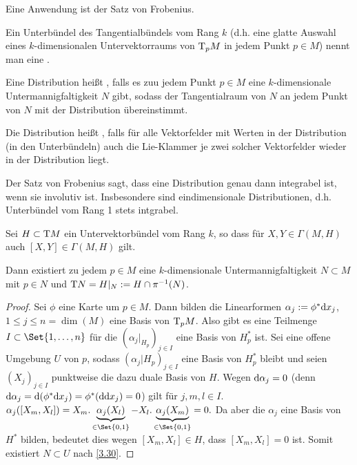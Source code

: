 Eine Anwendung ist der Satz von Frobenius.

Ein Unterbündel des Tangentialbündels vom Rang $k$ (d.h. eine glatte Auswahl eines $k$-dimensionalen Untervektorraums von $\mathrm{T}_p M$ in jedem Punkt $p \in M$) nennt man eine .

Eine Distribution heißt , falls es zuu jedem Punkt $p \in M$ eine $k$-dimensionale Untermannigfaltigkeit $N$ gibt, sodass der Tangentialraum von $N$ an jedem Punkt von $N$ mit der Distribution übereinstimmt.

Die Distribution heißt , falls für alle Vektorfelder mit Werten in der Distribution (in den Unterbündeln) auch die Lie-Klammer je zwei solcher Vektorfelder wieder in der Distribution liegt.

Der Satz von Frobenius sagt, dass eine Distribution genau dann integrabel ist, wenn sie involutiv ist.
Insbesondere sind eindimensionale Distributionen, d.h. Unterbündel vom Rang 1 stets intgrabel.

\begin{st}[Frobenius] \label{6.14}
    Sei $H \subset \mathrm{T} M$ ein Untervektorbündel vom Rang $k$, so dass für $X, Y \in \Gamma(M, H)$ auch $[X, Y] \in \Gamma(M, H)$ gilt.

    Dann existiert zu jedem $p \in M$ eine $k$-dimensionale Untermannigfaltigkeit $N \subset M$ mit $p \in N$ und $\mathrm{T} N = H |_N := H \cap \pi^{-1}(N)$.
    \begin{proof}
        Sei $\phi$ eine Karte um $p \in M$.
        Dann bilden die Linearformen $\alpha_j := \phi^* \mathrm{d} x_j$, $1 \le j \le n = \dim(M)$ eine Basis von $\mathrm{T}_p M$.
        Also gibt es eine Teilmenge $I \subset \Set{1, \dotsc, n}$ für die $(\alpha_j|_{H_p})_{j \in I}$ eine Basis von $H_p^*$ ist.
        Sei eine offene Umgebung $U$ von $p$, sodass $(\alpha_j| H_p)_{j \in I}$ eine Basis von $H_p^*$ bleibt und seien $(X_j)_{j \in I}$ punktweise die dazu duale Basis von $H$.
        Wegen $\mathrm{d} \alpha_j = 0$ (denn $\mathrm{d} \alpha_j = \mathrm{d}(\phi^* \mathrm{d} x_j) = \phi^*(\mathrm{d} \mathrm{d} x_j) = 0$) gilt für $j, m, l \in I$.
        \begin{math}
            \alpha_j( [X_m, X_l])
            = X_m . \underbrace{\alpha_j(X_l)}_{\in \Set{0,1}} - X_l . \underbrace{\alpha_j(X_m)}_{\in \Set{0, 1}}
            = 0.
        \end{math}
        Da aber die $\alpha_j$ eine Basis von $H^*$ bilden, bedeutet dies wegen $[X_m, X_l] \in H$, dass $[X_m, X_l] = 0$ ist.
        Somit existiert $N \subset U$ nach \ref{3.30}.
    \end{proof}
\end{st}


